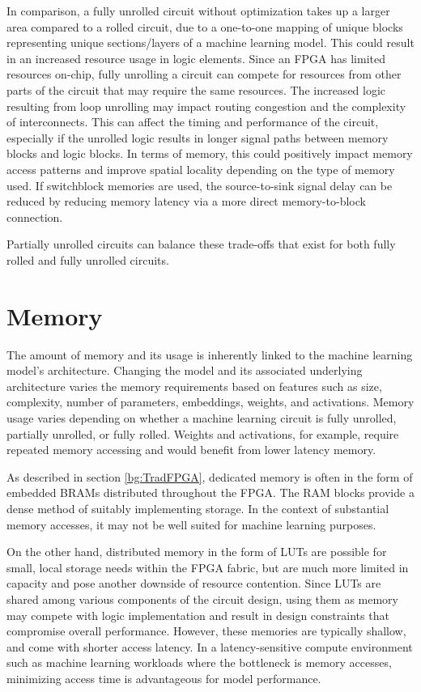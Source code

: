In comparison, a fully unrolled circuit without optimization takes up a larger area compared to a rolled circuit, due to a one-to-one mapping of unique blocks representing unique sections/layers of a machine learning model. This could result in an increased resource usage in logic elements. Since an FPGA has limited resources on-chip, fully unrolling a circuit can compete for resources from other parts of the circuit that may require the same resources. The increased logic resulting from loop unrolling may impact routing congestion and the complexity of interconnects. This can affect the timing and performance of the circuit, especially if the unrolled logic results in longer signal paths between memory blocks and logic blocks. 
In terms of memory, this could positively impact memory access patterns and improve spatial locality depending on the type of memory used. If switchblock memories are used, the source-to-sink signal delay can be reduced by reducing memory latency via a more direct memory-to-block connection. 

Partially unrolled circuits can balance these trade-offs that exist for both fully rolled and fully unrolled circuits.

\section{Memory}
\label{context:mem}

The amount of memory and its usage is inherently linked to the machine learning model's architecture. Changing the model and its associated underlying architecture varies the memory requirements based on features such as size, complexity, number of parameters, embeddings, weights, and activations. Memory usage varies depending on whether a machine learning circuit is fully unrolled, partially unrolled, or fully rolled. Weights and activations, for example, require repeated memory accessing and would benefit from lower latency memory.

As described in section \ref{bg:TradFPGA}, dedicated memory is often in the form of embedded BRAMs distributed throughout the FPGA. The RAM blocks provide a dense method of suitably implementing storage. In the context of substantial memory accesses, it may not be well suited for machine learning purposes.

On the other hand, distributed memory in the form of LUTs are possible for small, local storage needs within the FPGA fabric, but are much more limited in capacity and pose another downside of resource contention. Since LUTs are shared among various components of the circuit design, using them as memory may compete with logic implementation and result in design constraints that compromise overall performance. However, these memories are typically shallow, and come with shorter access latency. In a latency-sensitive compute environment such as machine learning workloads where the bottleneck is memory accesses, minimizing access time is advantageous for model performance.

